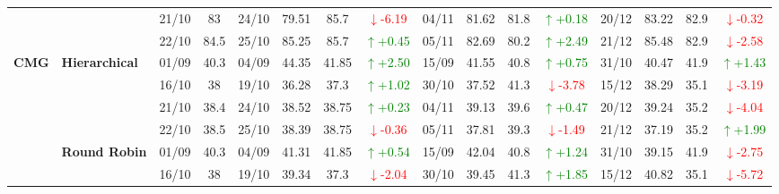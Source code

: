 \documentclass{ieeeaccess}
\begin{document}
{\begin{longtable}{llcc|cccc|cccc|cccc}
&
& 21/10 & 83 & 24/10 & 79.51 & 85.7 & \textcolor{red}{\(\downarrow\)-6.19} & 04/11 & 81.62 & 81.8 & \textcolor{green}{\(\uparrow\)+0.18} & 20/12 & 83.22 & 82.9 & \textcolor{red}{\(\downarrow\)-0.32} \\

&
& 22/10 & 84.5 & 25/10 & 85.25 & 85.7 & \textcolor{green}{\(\uparrow\)+0.45} & 05/11 & 82.69 & 80.2 & \textcolor{green}{\(\uparrow\)+2.49} & 21/12 & 85.48 & 82.9 & \textcolor{red}{\(\downarrow\)-2.58} \\




\midrule


\multirow{12}{*}{\textbf{CMG}} 
& \textbf{Hierarchical}
& 01/09 & 40.3 & 04/09 & 44.35 & 41.85 & \textcolor{green}{\(\uparrow\)+2.50} & 15/09 & 41.55 & 40.8 & \textcolor{green}{\(\uparrow\)+0.75} & 31/10 & 40.47 & 41.9 & \textcolor{green}{\(\uparrow\)+1.43} \\

& 
& 16/10 & 38 & 19/10 & 36.28 & 37.3 & \textcolor{green}{\(\uparrow\)+1.02} & 30/10 & 37.52 & 41.3 & \textcolor{red}{\(\downarrow\)-3.78} & 15/12 & 38.29 & 35.1 & \textcolor{red}{\(\downarrow\)-3.19} \\

& 
& 21/10 & 38.4 & 24/10 & 38.52 & 38.75 & \textcolor{green}{\(\uparrow\)+0.23} & 04/11 & 39.13 & 39.6 & \textcolor{green}{\(\uparrow\)+0.47} & 20/12 & 39.24 & 35.2 & \textcolor{red}{\(\downarrow\)-4.04} \\

&
& 22/10 & 38.5 & 25/10 & 38.39 & 38.75 & \textcolor{red}{\(\downarrow\)-0.36} & 05/11 & 37.81 & 39.3 & \textcolor{red}{\(\downarrow\)-1.49} & 21/12 & 37.19 & 35.2 & \textcolor{green}{\(\uparrow\)+1.99} \\
\cmidrule(lr){2-16}


& \textbf{Round Robin}
& 01/09 & 40.3 & 04/09 & 41.31 & 41.85 & \textcolor{green}{\(\uparrow\)+0.54} & 15/09 & 42.04 & 40.8 & \textcolor{green}{\(\uparrow\)+1.24} & 31/10 & 39.15 & 41.9 & \textcolor{red}{\(\downarrow\)-2.75} \\

& 
& 16/10 & 38 & 19/10 & 39.34 & 37.3 & \textcolor{red}{\(\downarrow\)-2.04} & 30/10 & 39.45 & 41.3 & \textcolor{green}{\(\uparrow\)+1.85} & 15/12 & 40.82 & 35.1 & \textcolor{red}{\(\downarrow\)-5.72} \\


\end{longtable}}
\end{document}
